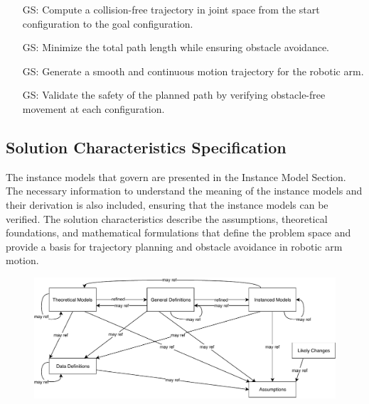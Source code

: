 \documentclass[12pt]{article}
\newcounter{goalnum} %
\begin{document}
\begin{itemize}

\item[GS\refstepcounter{goalnum}\thegoalnum \label{GS_CollisionFreePath}:] Compute a collision-free trajectory in joint space from the start configuration to the goal configuration.

\item[GS\refstepcounter{goalnum}\thegoalnum \label{GS_OptimizePath}:] Minimize the total path length while ensuring obstacle avoidance.

\item[GS\refstepcounter{goalnum}\thegoalnum \label{GS_SmoothMotion}:] Generate a smooth and continuous motion trajectory for the robotic arm.

\item[GS\refstepcounter{goalnum}\thegoalnum \label{GS_PathSafety}:] Validate the safety of the planned path by verifying obstacle-free movement at each configuration.

\end{itemize}

\subsection{Solution Characteristics Specification}

The instance models that govern \progname{} are presented in the Instance Model Section. The necessary information to understand the meaning of the instance models and their derivation is also included, ensuring that the instance models can be verified. The solution characteristics describe the assumptions, theoretical foundations, and mathematical formulations that define the problem space and provide a basis for trajectory planning and obstacle avoidance in robotic arm motion.


\begin{figure}[H]
  \includegraphics[scale=0.9]{RelationsBetweenTM_GD_IM_DD_A.pdf}
\end{figure}
\end{document}
